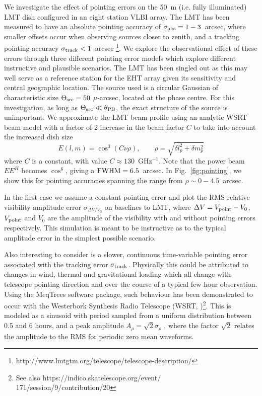 We investigate the effect of pointing errors on the 50~m (i.e. fully illuminated) LMT dish configured in an eight station VLBI array. The LMT has been measured to have an absolute pointing accuracy of $\sigma_{\rm abs} = 1-3$~arcsec, where smaller offsets occur when observing sources closer to zenith, and a tracking pointing accuracy $\sigma_{\rm track} < 1$~arcsec \footnote{http://www.lmtgtm.org/telescope/telescope-description/}. We explore the observational effect of these errors through three different pointing error models which explore different instructive and plausible scenarios. The LMT has been singled out as this may well serve as a reference station for the EHT array given its sensitivity and central geographic location. The source used is a circular Gaussian of characteristic size $\Theta_{\rm src}=50$ $\mu$-arcsec, located at the phase centre. For this investigation, as long as $\Theta_{\rm src} \ll \theta_{\rm PB}$, the exact structure of the source is unimportant. We approximate the LMT beam profile using an analytic WSRT beam model \citep{Popping_2008} with a factor of 2 increase in the beam factor $C$ to take into account the increased dish size
\begin{equation}
E(l, m) = \cos^3(C\nu \rho),\qquad   \rho = \sqrt{\delta l_p^2 + \delta m_p^2}
\end{equation}
where $C$ is a constant, with value $C \approx 130$~GHz$^{-1}$. Note that the power beam $EE^H$ becomes $\cos^6$, giving a $\rm{FWHM} = 6.5 $~arcsec. In Fig.~\ref{fig:pointing}, we show this for pointing accuracies spanning the range from $\rho \sim 0-4.5$~arcsec. 

In the first case we assume a constant pointing error and plot the RMS relative visibility amplitude error $\sigma_{\Delta V/V_0}$ on baselines to LMT, where $\Delta V = V_{\rm point} - V_{0}$, $V_{\rm point}$ and $V_{0}$ are the amplitude of the visibility with and without pointing errors respectively. This simulation is meant to be instructive as to the typical amplitude error in the simplest possible scenario.


Also interesting to consider is a slower, continuous time-variable pointing error associated with the tracking error $\sigma_{\rm track}$. Physically this could be attributed to changes in wind, thermal and gravitational loading which all change with telescope pointing direction and over the course of a typical few hour observation. Using the MeqTrees software package, such behaviour has been demonstrated to occur with the Westerbork Synthesis Radio Telescope (WSRT, \cite{Smirnov_2011c})\footnote{See also https://indico.skatelescope.org/event/\\171/session/9/contribution/20}. This is modeled as a sinusoid with period sampled from a uniform distribution between 0.5 and 6 hours, and a peak amplitude $A_{\rho} = \sqrt{2} \sigma_{\rho}$ , where the factor $\sqrt{2}$ relates the amplitude to the RMS for periodic zero mean waveforms. 


